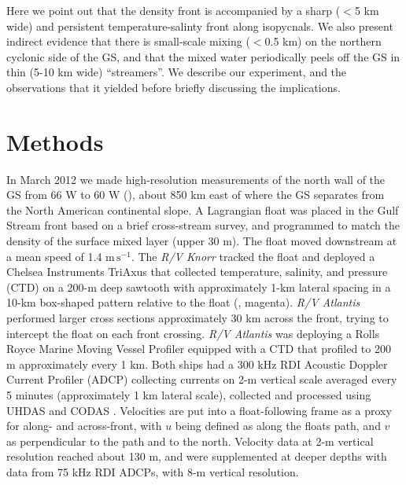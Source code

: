 \documentclass[draft,grl]{agutex2015}
\begin{document}
\begin{article}
Here we point out that the density front is accompanied by a sharp ($<$5 km wide) and persistent temperature-salinty front along isopycnals.  We also present indirect evidence that there is small-scale mixing ($<$0.5 km) on the northern cyclonic side of the GS, and that the mixed water periodically peels off the GS in thin (5-10 km wide) ``streamers''. We describe our experiment, and the observations that it yielded before briefly discussing the implications.

\section{Methods}

 In March 2012 we made high-resolution measurements of the north wall of the GS from 66 W to 60 W (), about 850 km east of where the GS separates from the North American continental slope.   A Lagrangian float \citep{dasaro03} was placed in the Gulf Stream front based on a brief cross-stream survey, and programmed to match the density of the surface mixed layer (upper 30 m).  The float moved downstream at a mean speed of 1.4 $\mathrm{m\,s^{-1}}$.  The \emph{R/V Knorr} tracked the float and deployed a Chelsea Instruments TriAxus that  collected temperature, salinity, and pressure (CTD) on a 200-m deep sawtooth with approximately 1-km lateral spacing in a 10-km box-shaped pattern relative to the float (, magenta).  \emph{R/V Atlantis} performed larger cross sections approximately 30 km across the front, trying to intercept the float on each front crossing.  \emph{R/V Atlantis} was deploying a Rolls Royce Marine Moving Vessel Profiler equipped with a CTD that profiled to 200 m approximately every 1 km.  Both ships had a 300 kHz RDI Acoustic Doppler Current Profiler (ADCP) collecting currents on 2-m vertical scale averaged every 5 minutes (approximately 1 km lateral scale), collected and processed using UHDAS and CODAS \citep[http://currents.soest.hawaii.edu,][]{firingetal12}.  Velocities are put into a float-following frame as a proxy for along- and across-front, with $u$ being defined as along the floats path, and $v$ as perpendicular to the path and to the north.  Velocity data at 2-m vertical resolution reached about 130 m, and were supplemented at deeper depths with data from 75 kHz RDI ADCPs, with 8-m vertical resolution.  


\end{article}
\end{document}
